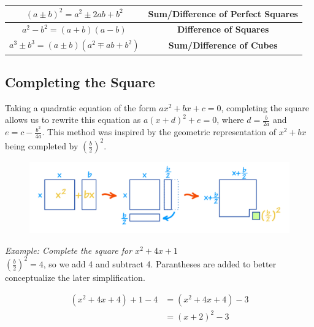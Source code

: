 \documentclass{article}
\begin{document}
    \begin{center}
        \begin{tabular}{|c|c|}
            \hline
            $(a\pm b)^2 = a^2\pm 2ab+b^2$         & \textbf{Sum/Difference of Perfect Squares} \\
            \hline
            $a^2-b^2=(a+b)(a-b)$                  & \textbf{Difference of Squares}             \\
            \hline
            $a^3\pm b^3=(a\pm b)(a^2 \mp ab+b^2)$ & \textbf{Sum/Difference of Cubes}           \\
            \hline
        \end{tabular}
    \end{center}

    \subsection{Completing the Square}

    Taking a quadratic equation of the form $ax^2+bx+c=0$, completing the square allows us to
    rewrite this equation as $a(x+d)^2+e=0$, where $d=\frac{b}{2a}$ and $e=c-\frac{b^2}{4a}$.
    This method was inspired by the geometric representation of $x^2+bx$ being completed by
    $\left(\frac{b}{2}\right)^2$.

    \begin{figure} [hbt!]
        \centering
        \includegraphics [scale = 0.4] {Resources/Unit2Quadratics/Completing_The_Square.png}
    \end{figure}

    \noindent \color{blue} \textit{Example: Complete the square for $x^2+4x+1$} \color{black} \\
    $\left(\frac{b}{2}\right)^2 = 4$, so we add 4 and subtract 4. Parantheses are added to
    better conceptualize the later simplification.

    \begin{align*}
        (x^2+4x+4)+1-4 &= (x^2+4x+4) - 3 \\
        &= (x+2)^2 - 3
    \end{align*}
\end{document}
